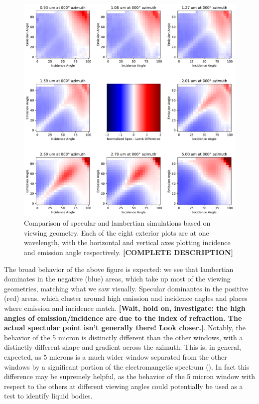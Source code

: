 \documentclass{article}
\begin{document}
\begin{figure}[htb]
\includegraphics[scale = 0.44]{SpecLambNormDiff.pdf}
\centering
\caption{Comparison of specular and lambertian simulations based on viewing geometry. Each of the eight exterior plots are at one wavelength, with the horizontal and vertical axes plotting incidence and emission angle respectively. \textbf{\color{red}[COMPLETE DESCRIPTION]\color{black}}}
\label{fig:10}
\end{figure}

The broad behavior of the above figure is expected: we see that lambertian dominates in the negative (blue) areas, which take up most of the viewing geometries, matching what we saw visually. Specular dominantes in the positive (red) areas, which cluster around high emission and incidence angles and places where emission and incidence match. \textbf{\color{red}[Wait, hold on, investigate: the high angles of emission/incidence are due to the index of refraction. The actual spectular point isn't generally there! Look closer.]\color{black}}. Notably, the behavior of the 5 micron is distinctly different than the other windows, with a distinctly different shape and gradient across the azimuth. This is, in general, expected, as 5 microns is a much wider window separated from the other windows by a significant portion of the electromangetic spectrum (). In fact this difference may be supremely helpful, as the behavior of the 5 micron window with respect to the others at different viewing angles could potentially be used as a test to identify liquid bodies. 
\end{document}
